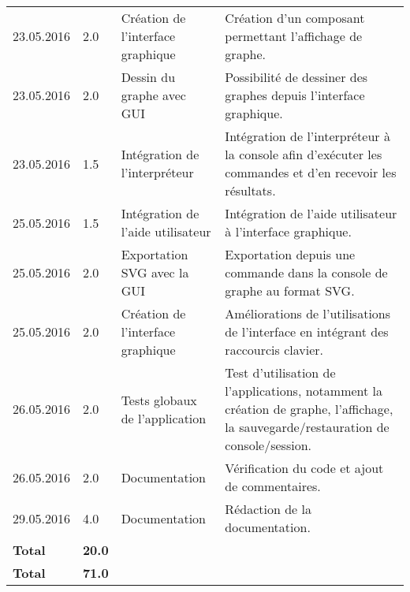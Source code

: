 \documentclass[french]{article}
\begin{document}
\begin{longtable}{p{}|p{}|p{}|p{}}
		23.05.2016 & 2.0 & Création de l'interface graphique & Création d'un composant permettant l'affichage de graphe.\\
		23.05.2016 & 2.0 & Dessin du graphe avec GUI & Possibilité de dessiner des graphes depuis l'interface graphique.\\
		23.05.2016 & 1.5 & Intégration de l'interpréteur & Intégration de l'interpréteur à la console afin d'exécuter les commandes et d'en recevoir les résultats.\\
		25.05.2016 & 1.5 & Intégration de l'aide utilisateur & Intégration de l'aide utilisateur à l'interface graphique.\\
		25.05.2016 & 2.0 & Exportation SVG avec la GUI & Exportation depuis une commande dans la console de graphe au format SVG.\\
		25.05.2016 & 2.0 & Création de l'interface graphique & Améliorations de l'utilisations de l'interface en intégrant des raccourcis clavier.\\
		26.05.2016 & 2.0 & Tests globaux de l'application & Test d'utilisation de l'applications, notamment la création de graphe, l'affichage, la sauvegarde/restauration de console/session.\\
		26.05.2016 & 2.0 & Documentation & Vérification du code et ajout de commentaires.\\
		29.05.2016 & 4.0 & Documentation & Rédaction de la documentation.\\
		\textbf{Total} & \textbf{20.0} &&\\
		\hline
		\hline
		\textbf{Total} & \textbf{71.0} &&\\
	\end{longtable}
	
\end{document}
